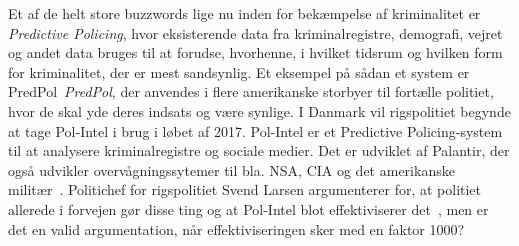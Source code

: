 Et af de helt store buzzwords lige nu inden for bekæmpelse af kriminalitet er \textit{Predictive Policing}, hvor eksisterende data fra kriminalregistre, demografi, vejret og andet data bruges til at forudse, hvorhenne, i hvilket tidsrum og hvilken form for kriminalitet, der er mest sandsynlig. Et eksempel på sådan et system er PredPol~\textit{PredPol}, der anvendes i flere amerikanske storbyer til fortælle politiet, hvor de skal yde deres indsats og være synlige. I Danmark vil rigspolitiet begynde at tage Pol-Intel i brug i løbet af 2017. Pol-Intel er et Predictive Policing-system til at analysere kriminalregistre og sociale medier. Det er udviklet af Palantir, der også udvikler overvågningssytemer til bla. NSA, CIA og det amerikanske militær~\cite[]{PolIntel}. Politichef for rigspolitiet Svend Larsen argumenterer for, at politiet allerede i forvejen gør disse ting og at Pol-Intel blot effektiviserer det~\cite[]{Aflyttet}, men er det en valid argumentation, når effektiviseringen sker med en faktor 1000?


\begin{comment}

\end{comment}
